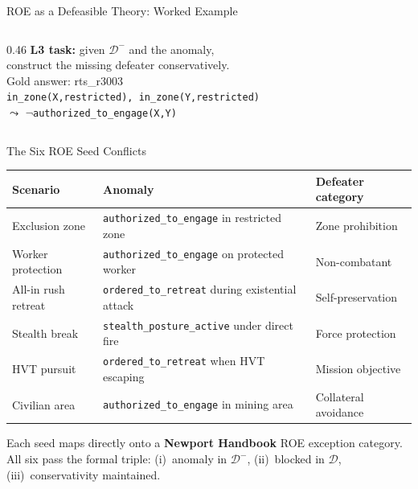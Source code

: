 \documentclass[aspectratio=169, 10pt]{beamer}
\newcommand{\D}{\mathcal{D}}
\begin{document}
\begin{frame}{ROE as a Defeasible Theory: Worked Example}
\begin{columns}[T]
\begin{column}{0.46\textwidth}
      \textbf{L3 task:} given $\D^-$ and the anomaly,\\
      construct the missing defeater conservatively.\\[0.4em]
      Gold answer: rts\_r3003\\
      \texttt{in\_zone(X,restricted), in\_zone(Y,restricted)}\\
      $\leadsto$ $\neg$\texttt{authorized\_to\_engage(X,Y)}
    \end{column}
  \end{columns}
\end{frame}

\begin{frame}{The Six ROE Seed Conflicts}

  \begin{center}
  \begin{tabular}{@{}lll@{}}
    \toprule
    Scenario & Anomaly & Defeater category \\
    \midrule
    Exclusion zone & \texttt{authorized\_to\_engage} in restricted zone
                   & Zone prohibition \\
    Worker protection & \texttt{authorized\_to\_engage} on protected worker
                      & Non-combatant \\
    All-in rush retreat & \texttt{ordered\_to\_retreat} during existential attack
                        & Self-preservation \\
    Stealth break & \texttt{stealth\_posture\_active} under direct fire
                  & Force protection \\
    HVT pursuit & \texttt{ordered\_to\_retreat} when HVT escaping
                & Mission objective \\
    Civilian area & \texttt{authorized\_to\_engage} in mining area
                  & Collateral avoidance \\
    \bottomrule
  \end{tabular}
  \end{center}

  \vspace{0.4em}
  Each seed maps directly onto a \textbf{Newport Handbook} ROE exception category.\\
  All six pass the formal triple: (i)~anomaly in $\D^-$, (ii)~blocked in $\D$,
  (iii)~conservativity maintained.
\end{frame}

\end{document}
